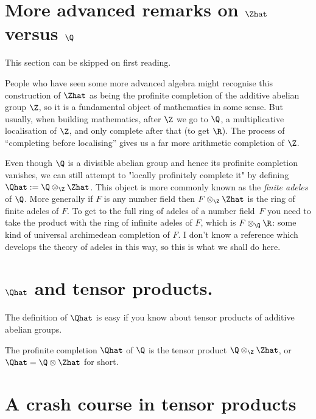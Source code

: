 \section{More advanced remarks on \texorpdfstring{$\Zhat$}{Zhat} versus \texorpdfstring{$\Q$}{Q}}

This section can be skipped on first reading.

People who have seen some more advanced algebra might recognise this construction of $\Zhat$
as being the profinite completion of the additive abelian group $\Z$, so it is a fundamental
object of mathematics in some sense. But usually, when building mathematics, after $\Z$ we
go to $\Q$, a multiplicative localisation of $\Z$, and only complete after that (to get $\R$).
The process of ``completing before localising'' gives us a far more arithmetic completion
of $\Z$.

Even though $\Q$ is a divisible abelian group and hence its profinite completion vanishes,
we can still attempt to "locally profinitely complete it" by defining $\Qhat:=\Q\otimes_{\Z}\Zhat$.
This object is more commonly known as the \emph{finite adeles} of $\Q$. More generally if $F$ is
any number field then $F\otimes_{\Z}\Zhat$ is the ring of finite adeles of $F$. To get to
the full ring of adeles of a number field~$F$ you need to take the product with the
ring of infinite adeles of $F$, which is $F\otimes_{\Q}\R$: some kind of universal
archimedean completion of $F$. I don't know a reference which develops the theory of adeles
in this way, so this is what we shall do here.

\section{\texorpdfstring{$\Qhat$}{Qhat} and tensor products.}

The definition of $\Qhat$ is easy if you know about tensor products
of additive abelian groups.

\begin{definition}
    \label{QHat}
    \leanok
    The profinite completion $\Qhat$ of $\Q$ is the tensor product $\Q\otimes_{\Z}\Zhat$,
    or $\Qhat=\Q\otimes\Zhat$ for short.
\end{definition}

\section{A crash course in tensor products}

